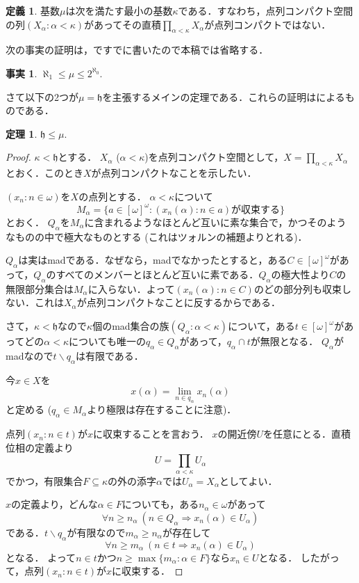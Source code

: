 \documentclass[uplatex,dvipdfmx]{jsarticle}
\newcommand{\h}{\mathfrak{h}}
\renewcommand\subset{\subseteq}
\renewcommand{\setminus}{\smallsetminus}
\theoremstyle{definition}
\newtheorem{thm}{定理}
\newtheorem*{defi*}{定義}
\newtheorem*{fact*}{事実}
\theoremstyle{named}
\begin{document}
\begin{defi*}
基数$\mu$は次を満たす最小の基数$\kappa$である．すなわち，点列コンパクト空間の列$(X_\alpha : \alpha < \kappa)$があってその直積$\prod_{\alpha < \kappa} X_\alpha$が点列コンパクトではない．
\end{defi*}

次の事実の証明は，\cite{fujidig}ですでに書いたので本稿では省略する．
\begin{fact*}
$\aleph_1 \le \mu \le 2^{\aleph_0}$.
\end{fact*}

さて以下の2つが$\mu = \h$を主張するメインの定理である．これらの証明は\cite{simon1993products}によるものである．

\begin{thm}
$\h \le \mu$.
\end{thm}
\begin{proof}
$\kappa < \h$とする．
$X_\alpha$ ($\alpha < \kappa$)を点列コンパクト空間として，$X = \prod_{\alpha < \kappa} X_\alpha$とおく．このとき$X$が点列コンパクトなことを示したい．

$(x_n : n \in \omega)$を$X$の点列とする．
$\alpha < \kappa$について
\[
M_\alpha = \{ a \in [\omega]^\omega : \text{$(x_n(\alpha) : n \in a)$が収束する} \}
\]
とおく．
$Q_\alpha$を$M_\alpha$に含まれるようなほとんど互いに素な集合で，かつそのようなものの中で極大なものとする (これはツォルンの補題よりとれる)．

$Q_\alpha$は実はmadである．なぜなら，madでなかったとすると，ある$C \in [\omega]^\omega$があって，$Q_\alpha$のすべてのメンバーとほとんど互いに素である．$Q_\alpha$の極大性より$C$の無限部分集合は$M_\alpha$に入らない．よって$(x_n(\alpha) : n \in C)$のどの部分列も収束しない．これは$X_\alpha$が点列コンパクトなことに反するからである．

さて，$\kappa < \h$なので$\kappa$個のmad集合の族$(Q_\alpha : \alpha < \kappa)$について，ある$t \in [\omega]^\omega$があってどの$\alpha < \kappa$についても唯一の$q_\alpha \in Q_\alpha$があって，$q_\alpha \cap t$が無限となる．
$Q_\alpha$がmadなので$t \setminus q_\alpha$は有限である．

今$x \in X$を
\[
x(\alpha) = \lim_{n \in q_\alpha} x_n(\alpha)
\]
と定める ($q_\alpha \in M_\alpha$より極限は存在することに注意)．

点列$(x_n : n \in t)$が$x$に収束することを言おう．
$x$の開近傍$U$を任意にとる．直積位相の定義より
\[
U = \prod_{\alpha < \kappa} U_\alpha
\]
でかつ，有限集合$F \subset \kappa$の外の添字$\alpha$では$U_\alpha = X_\alpha$としてよい．

$x$の定義より，どんな$\alpha \in F$についても，ある$n_\alpha \in \omega$があって
\[
\forall n \ge n_\alpha \ (n \in Q_\alpha \Rightarrow x_n(\alpha) \in U_\alpha)
\]
である．$t \setminus q_\alpha$が有限なので$m_\alpha \ge n_\alpha$が存在して
\[
\forall n \ge m_\alpha \ (n \in t \Rightarrow x_n(\alpha) \in U_\alpha)
\]
となる．
よって$n \in t$かつ$n \ge \max\{m_\alpha : \alpha \in F \}$なら$x_n \in U$となる．
したがって，点列$(x_n : n \in t)$が$x$に収束する．
\end{proof}
\end{document}
